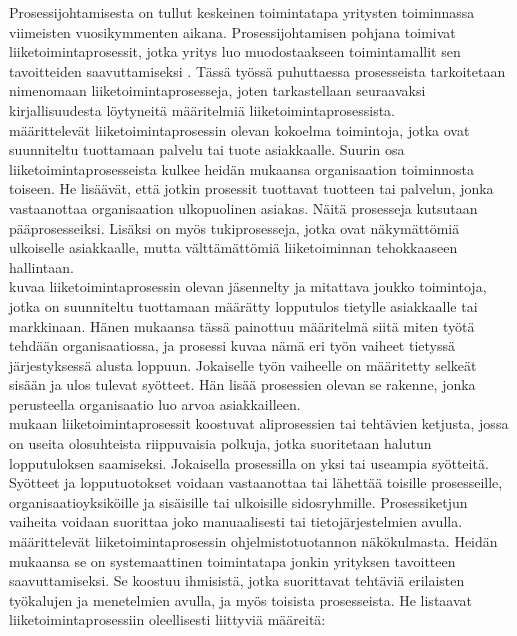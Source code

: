 \documentclass[finnish,12pt,a4paper,pdftex]{article}
\begin{document}
Prosessijohtamisesta on tullut keskeinen toimintatapa yritysten toiminnassa viimeisten vuosikymmenten aikana. Prosessijohtamisen pohjana toimivat liiketoimintaprosessit, jotka yritys luo muodostaakseen toimintamallit sen tavoitteiden saavuttamiseksi \citep{ohjelmistotuotanto}. Tässä työssä puhuttaessa prosesseista tarkoitetaan nimenomaan liiketoimintaprosesseja, joten tarkastellaan seuraavaksi kirjallisuudesta löytyneitä määritelmiä liiketoimintaprosessista.\\

\cite{rumbra} määrittelevät liiketoimintaprosessin olevan kokoelma toimintoja, jotka ovat suunniteltu tuottamaan palvelu tai tuote asiakkaalle. Suurin osa liiketoimintaprosesseista kulkee heidän mukaansa organisaation toiminnosta toiseen. He lisäävät, että jotkin prosessit tuottavat tuotteen tai palvelun, jonka vastaanottaa organisaation ulkopuolinen asiakas. Näitä prosesseja kutsutaan pääprosesseiksi. Lisäksi on myös tukiprosesseja, jotka ovat näkymättömiä ulkoiselle asiakkaalle, mutta välttämättömiä liiketoiminnan tehokkaaseen hallintaan.\\

\cite{davenport} kuvaa liiketoimintaprosessin olevan jäsennelty ja mitattava joukko toimintoja, jotka on suunniteltu tuottamaan määrätty lopputulos tietylle asiakkaalle tai markkinaan. Hänen mukaansa tässä painottuu määritelmä siitä miten työtä tehdään organisaatiossa, ja prosessi kuvaa nämä eri työn vaiheet tietyssä järjestyksessä alusta loppuun. Jokaiselle työn vaiheelle on määritetty selkeät sisään ja ulos tulevat syötteet. Hän lisää prosessien olevan se rakenne, jonka perusteella organisaatio luo arvoa asiakkailleen.\\

\cite{weske} mukaan liiketoimintaprosessit koostuvat aliprosessien tai tehtävien ketjusta, jossa on useita olosuhteista riippuvaisia polkuja, jotka suoritetaan halutun lopputuloksen saamiseksi. Jokaisella prosessilla on yksi tai useampia syötteitä. Syötteet ja lopputuotokset voidaan vastaanottaa tai lähettää toisille prosesseille, organisaatioyksiköille ja  sisäisille tai ulkoisille sidosryhmille. Prosessiketjun vaiheita voidaan suorittaa joko manuaalisesti tai tietojärjestelmien avulla.\\

\cite{okaytannot} määrittelevät liiketoimintaprosessin ohjelmistotuotannon näkökulmasta. Heidän mukaansa se on systemaattinen toimintatapa jonkin yrityksen tavoitteen saavuttamiseksi. Se koostuu ihmisistä, jotka suorittavat tehtäviä erilaisten työkalujen ja menetelmien avulla, ja myös toisista prosesseista. He listaavat liiketoimintaprosessiin oleellisesti liittyviä määreitä:
\end{document}

